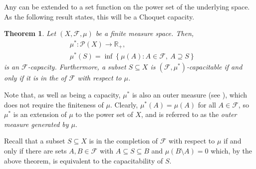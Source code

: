 \documentclass[12pt]{article}
\newtheorem*{theorem*}{Theorem}
\begin{document}

Any  can be extended to a set function on the power set of the underlying space. As the following result states, this will be a Choquet capacity.

\begin{theorem*}
Let $(X,\mathcal{F},\mu)$ be a finite measure space. Then,
\begin{align*}
&\mu^*\colon\mathcal{P}(X)\to\mathbb{R}_+,\\
&\mu^*(S)=\inf\left\{\mu(A)\colon A\in\mathcal{F},\ A\supseteq S\right\} 
\end{align*}
is an $\mathcal{F}$-capacity. Furthermore, a subset $S\subseteq X$ is $(\mathcal{F},\mu^*)$-capacitable if and only if it is in the  of $\mathcal{F}$ with respect to $\mu$.
\end{theorem*}

Note that, as well as being a capacity, $\mu^*$ is also an outer measure (see ), which does not require the finiteness of $\mu$.
Clearly, $\mu^*(A)=\mu(A)$ for all $A\in\mathcal{F}$, so $\mu^*$ is an extension of $\mu$ to the power set of $X$, and is referred to as the \emph{outer measure generated by $\mu$}.

Recall that a subset $S\subseteq X$ is in the completion of $\mathcal{F}$ with respect to $\mu$ if and only if there are sets $A,B\in\mathcal{F}$ with $A\subseteq S\subseteq B$ and $\mu(B\setminus A)=0$ which, by the above theorem, is equivalent to the capacitability of $S$.

\end{document}

